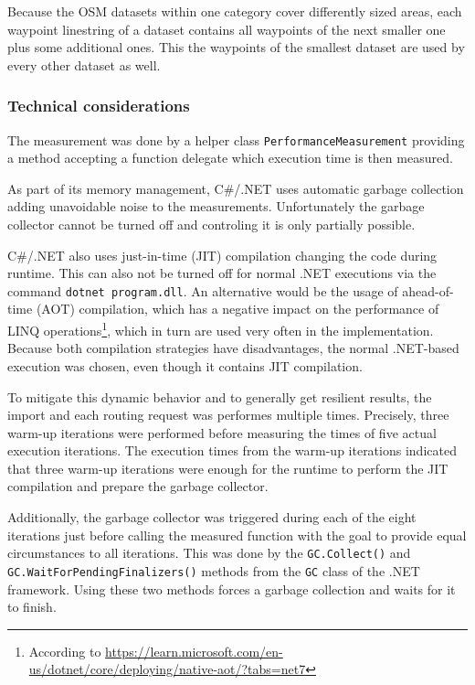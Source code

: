 			Because the OSM datasets within one category cover differently sized areas, each waypoint linestring of a dataset contains all waypoints of the next smaller one plus some additional ones.
			This the waypoints of the smallest dataset are used by every other dataset as well.
		
		\subsubsection{Technical considerations}
		
			The measurement was done by a helper class \texttt{PerformanceMeasurement} providing a method accepting a function delegate which execution time is then measured.
			
			As part of its memory management, C\#/.NET uses automatic garbage collection adding unavoidable noise to the measurements.
			Unfortunately the garbage collector cannot be turned off and controling it is only partially possible.
		
			C\#/.NET also uses just-in-time (JIT) compilation changing the code during runtime.
			This can also not be turned off for normal .NET executions via the command \texttt{dotnet program.dll}.
			An alternative would be the usage of ahead-of-time (AOT) compilation, which has a negative impact on the performance of LINQ operations\footnote{According to \url{https://learn.microsoft.com/en-us/dotnet/core/deploying/native-aot/?tabs=net7}}, which in turn are used very often in the implementation.
			Because both compilation strategies have disadvantages, the normal .NET-based execution was chosen, even though it contains JIT compilation.
			
			To mitigate this dynamic behavior and to generally get resilient results, the import and each routing request was performes multiple times.
			Precisely, three warm-up iterations were performed before measuring the times of five actual execution iterations.
			The execution times from the warm-up iterations indicated that three warm-up iterations were enough for the runtime to perform the JIT compilation and prepare the garbage collector.
			
			Additionally, the garbage collector was triggered during each of the eight iterations just before calling the measured function with the goal to provide equal circumstances to all iterations.
			This was done by the \texttt{GC.Collect()} and \texttt{GC.WaitForPendingFinalizers()} methods from the \texttt{GC} class of the .NET framework.
			Using these two methods forces a garbage collection and waits for it to finish\cite{ms-gc}.
			
